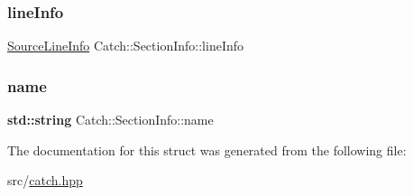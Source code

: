 \subsubsection{\texorpdfstring{line\+Info}{lineInfo}}
{\footnotesize\ttfamily \hyperlink{struct_catch_1_1_source_line_info}{Source\+Line\+Info} Catch\+::\+Section\+Info\+::line\+Info}

\mbox{\label{struct_catch_1_1_section_info_a704c8fc662d309137e0d4f199cb7df58}} 
\subsubsection{\texorpdfstring{name}{name}}
{\footnotesize\ttfamily \textbf{ std\+::string} Catch\+::\+Section\+Info\+::name}



The documentation for this struct was generated from the following file\+:\begin{DoxyCompactItemize}
\item 
src/\hyperlink{catch_8hpp}{catch.\+hpp}\end{DoxyCompactItemize}
